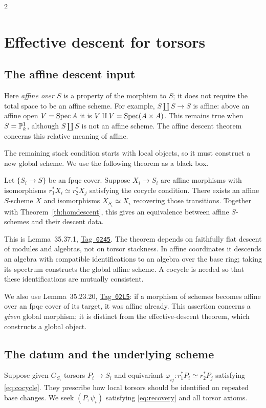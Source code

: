 \documentclass[12pt]{memoir}
\newcommand{\BGtag}[1]{\href{https://stacks.math.columbia.edu/tag/#1}{Tag~\texttt{#1}}}
\begin{document}
\begin{multicols}{2}
\section{Effective descent for torsors}\label{sec:effective}

\subsection{The affine descent input}
Here \emph{affine over $S$} is a property of the morphism to $S$;
it does not require the total space to be an affine scheme. For
example, $S\amalg S\to S$ is affine: above an affine open
$V=\operatorname{Spec} A$ it is
$V\amalg V=\operatorname{Spec}(A\times A)$. This remains true when
$S=\mathbb{P}^1_k$, although $S\amalg S$ is not an affine scheme.
The affine descent theorem concerns this relative meaning of affine.

The remaining stack condition starts with local objects, so it must
construct a new global scheme. We use the following theorem as a black box.

\begin{Th}\label{th:affinedescent}
Let $\{S_i\to S\}$ be an fpqc cover. Suppose $X_i\to S_i$ are affine
morphisms with isomorphisms $r_1^*X_i\simeq r_2^*X_j$ satisfying the
cocycle condition. There exists an affine $S$-scheme $X$ and
isomorphisms $X_{S_i}\simeq X_i$ recovering those transitions.
Together with Theorem~\ref{th:homdescent}, this gives an equivalence
between affine $S$-schemes and their descent data.
\end{Th}
This is Lemma~35.37.1, \BGtag{0245}. The theorem depends on faithfully
flat descent of modules and algebras, not on torsor stackness. In affine
coordinates it descends an algebra with compatible identifications to
an algebra over the base ring; taking its spectrum constructs the
global affine scheme. A cocycle is needed so that these identifications
are mutually consistent.

We also use Lemma~35.23.20, \BGtag{02L5}: if a morphism of schemes
becomes affine over an fpqc cover of its target, it was affine already.
This assertion concerns a \emph{given} global morphism; it is distinct
from the effective-descent theorem, which constructs a global object.

\subsection{The datum and the underlying scheme}
Suppose given $G_{S_i}$-torsors $P_i\to S_i$ and equivariant
$\varphi_{ij}:r_1^*P_i\simeq r_2^*P_j$ satisfying
\eqref{eq:cocycle}. They prescribe how local torsors should be identified
on repeated base changes. We seek $(P,\psi_i)$ satisfying
\eqref{eq:recovery} and all torsor axioms.


\end{multicols}
\end{document}

